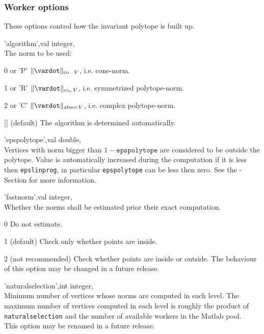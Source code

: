 \subsubsection{Worker options} These options control  how the invariant polytope is built up.
\begin{param}
\item['algorithm',val] integer, \\The norm to be used:
\begin{param}
\item[0 or 'P'] $\|\vardot\|_{\operatorname{co}_{-}V}$, i.e. cone-norm.
\item[1 or 'R'] $\|\vardot\|_{\operatorname{co}_{s}V}$, i.e. symmetrized polytope-norm.
\item[2 or 'C'] $\|\vardot\|_{\operatorname{absco}V}$, i.e. complex polytope-norm.
\item[{[]}] (default) The algorithm is determined automatically.
\end{param}

\item['epspolytope',val] double, \\Vertices with norm bigger than $1-\texttt{epspolytope}$ are considered to be outside the polytope. Value is automatically increased during the computation if it is less then \texttt{epslinprog}, in particular \texttt{epspolytope} can be less then zero. See the -Section for more information.

\item['fastnorm',val] integer, \\Whether the norms shall be estimated prior their exact computation.
\begin{param}
\item[0] Do not estimate.
\item[1] (default) Check only whether points are inside.
\item[2] (not recommended) Check whether points are inside or outside. The behaviour of this option may be changed in a future release.
\end{param}

\item['naturalselection',int] integer, \\Minimum number of vertices whose norms are computed in each level. The maximum number of vertices computed in each level is roughly the product of
\texttt{naturalselection} and the number of available workers in the Matlab pool.\\
This option may be renamed in a future release.


\end{param}

